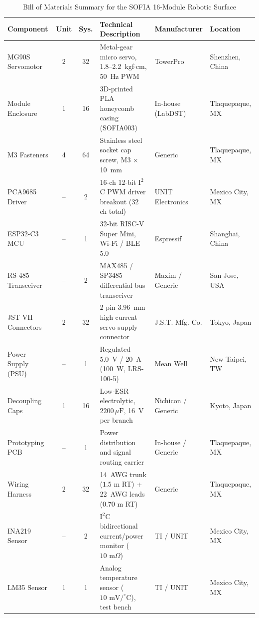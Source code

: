 \documentclass[lettersize,journal]{IEEEtran}
\begin{document}
	\begin{table}[!t]
		\centering
		\caption{Bill of Materials Summary for the SOFIA 16-Module Robotic Surface}
		\label{tab:bom_sofia}
		\scriptsize
		\setlength{\tabcolsep}{3pt}
		\renewcommand{\arraystretch}{0.82}
		\begin{tabular}{@{}p{2.6cm} c c p{5.9cm} p{2.3cm} p{2.1cm}@{}}
			\toprule
			\textbf{Component} & \textbf{Unit} & \textbf{Sys.} & \textbf{Technical Description} & \textbf{Manufacturer} & \textbf{Location} \\
			\midrule
			MG90S Servomotor & 2 & 32 & Metal-gear micro servo, 1.8--2.2~kgf$\cdot$cm, 50~Hz PWM & TowerPro & Shenzhen, China \\
			Module Enclosure & 1 & 16 & 3D-printed PLA honeycomb casing (SOFIA003) & In-house (LabDST) & Tlaquepaque, MX \\
			M3 Fasteners & 4 & 64 & Stainless steel socket cap screw, M3 $\times$ 10~mm & Generic & Tlaquepaque, MX \\
			PCA9685 Driver & -- & 2 & 16-ch 12-bit I$^2$C PWM driver breakout (32 ch total) & UNIT Electronics & Mexico City, MX \\
			ESP32-C3 MCU & -- & 1 & 32-bit RISC-V Super Mini, Wi-Fi / BLE 5.0 & Espressif & Shanghai, China \\
			RS-485 Transceiver & -- & 2 & MAX485 / SP3485 differential bus transceiver & Maxim / Generic & San Jose, USA \\
			JST-VH Connectors & 2 & 32 & 2-pin 3.96~mm high-current servo supply connector & J.S.T. Mfg. Co. & Tokyo, Japan \\
			Power Supply (PSU) & -- & 1 & Regulated 5.0~V / 20~A (100~W, LRS-100-5) & Mean Well & New Taipei, TW \\
			Decoupling Caps & 1 & 16 & Low-ESR electrolytic, $2200\,\mu\text{F}$, 16~V per branch & Nichicon / Generic & Kyoto, Japan \\
			Prototyping PCB & -- & 1 & Power distribution and signal routing carrier & In-house / Generic & Tlaquepaque, MX \\
			Wiring Harness & 2 & 32 & 14~AWG trunk ($1.5\text{ m}$ RT) + 22~AWG leads ($0.70\text{ m}$ RT) & Generic & Tlaquepaque, MX \\
			INA219 Sensor & -- & 2 & I$^2$C bidirectional current/power monitor ($10\text{ m}\Omega$) & TI / UNIT & Mexico City, MX \\
			LM35 Sensor & 1 & 1 & Analog temperature sensor ($10\text{ mV}/^\circ\text{C}$), test bench & TI / UNIT & Mexico City, MX \\
			\bottomrule
		\end{tabular}
	\end{table}
	
\end{document}
